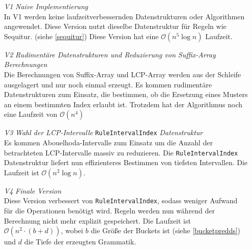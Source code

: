 \begin{itemize}
    \item[\emph{V1}] \emph{Naive Implementierung}\\
    In V1 werden keine laufzeitverbessernden Datenstrukturen oder Algorithmen angewendet.
    Diese Version nutzt dieselbe Datenstruktur für Regeln wie Sequitur. (siehe \autoref{sequitur}) Diese Version hat eine $\mathcal{O}(n^5 \log n)$ Laufzeit.
    \item[\emph{V2}] \emph{Rudimentäre Datenstrukturen und Reduzierung von Suffix-Array Berechnungen}\\
    Die Berechnungen von Suffix-Array und LCP-Array werden aus der Schleife ausgelagert und nur noch einmal erzeugt. Es kommen rudimentäre Datenstrukturen zum Einsatz, die bestimmen, ob die Ersetzung eines Musters an einem bestimmten Index erlaubt ist. Trotzdem hat der Algorithmus noch eine Laufzeit von $\mathcal{O}(n^4)$  
    \item[\emph{V3}] \emph{Wahl der LCP-Intervalle} \texttt{RuleIntervalIndex} \emph{Datenstruktur}\\
    Es kommen Abouelhoda-Intervalle zum Einsatz um die Anzahl der betrachteten LCP-Intervalle massiv zu reduzieren. Die \texttt{RuleIntervalIndex} Datenstruktur liefert nun effizienteres Bestimmen von tiefsten Intervallen. Die Laufzeit ist $\mathcal{O}(n^2 \log n)$.
    \item[\emph{V4}] \emph{Finale Version}\\
    Diese Version verbessert von \texttt{RuleIntervalIndex}, sodass weniger Aufwand für die Operationen benötigt wird. Regeln werden nun während der Berechnung nicht mehr  explizit gespeichert. Die Laufzeit ist $\mathcal{O}(n^2 \cdot (b + d))$, wobei $b$ die Größe der Buckets ist (siehe \autoref{bucketpredds}) und $d$ die Tiefe der erzeugten Grammatik.
\end{itemize}

\newpage

\newpage

\newpage

\newpage

\newpage
